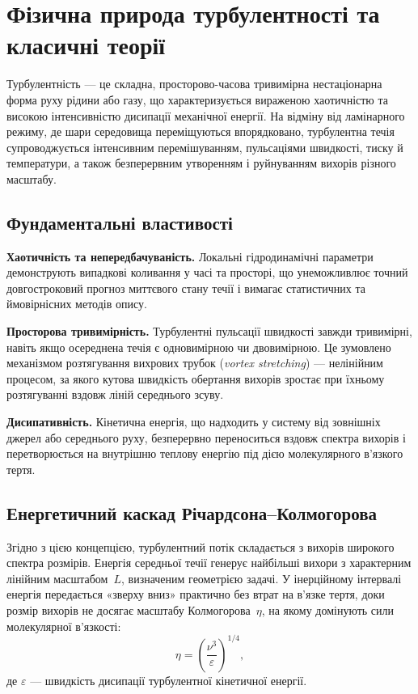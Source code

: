\documentclass[14pt,a4paper,extarticle]{extarticle}
\begin{document}
\section{Фізична природа турбулентності та класичні теорії}

Турбулентність --- це складна, просторово-часова тривимірна нестаціонарна
форма руху рідини або газу, що характеризується вираженою хаотичністю та
високою інтенсивністю дисипації механічної енергії. На відміну від
ламінарного режиму, де шари середовища переміщуються впорядковано,
турбулентна течія супроводжується інтенсивним перемішуванням, пульсаціями
швидкості, тиску й температури, а також безперервним утворенням і руйнуванням
вихорів різного масштабу.

\subsection{Фундаментальні властивості}

\textbf{Хаотичність та непередбачуваність.} Локальні гідродинамічні параметри
демонструють випадкові коливання у часі та просторі, що унеможливлює точний
довгостроковий прогноз миттєвого стану течії і вимагає статистичних та
ймовірнісних методів опису.

\textbf{Просторова тривимірність.} Турбулентні пульсації швидкості завжди
тривимірні, навіть якщо осереднена течія є одновимірною чи двовимірною.
Це зумовлено механізмом розтягування вихрових трубок (\emph{vortex stretching})
--- нелінійним процесом, за якого кутова швидкість обертання вихорів зростає
при їхньому розтягуванні вздовж ліній середнього зсуву.

\textbf{Дисипативність.} Кінетична енергія, що надходить у систему від
зовнішніх джерел або середнього руху, безперервно переноситься вздовж
спектра вихорів і перетворюється на внутрішню теплову енергію під дією
молекулярного в'язкого тертя.

\subsection{Енергетичний каскад Річардсона--Колмогорова}

Згідно з цією концепцією, турбулентний потік складається з вихорів широкого
спектра розмірів. Енергія середньої течії генерує найбільші вихори з
характерним лінійним масштабом~$L$, визначеним геометрією задачі. У
інерційному інтервалі енергія передається «зверху вниз» практично без втрат
на в'язке тертя, доки розмір вихорів не досягає масштабу Колмогорова~$\eta$,
на якому домінують сили молекулярної в'язкості:
\begin{equation}
  \eta = \left( \frac{\nu^3}{\varepsilon} \right)^{1/4},
  \label{eq:kolmogorov}
\end{equation}
де $\varepsilon$ --- швидкість дисипації турбулентної кінетичної енергії.
\end{document}
